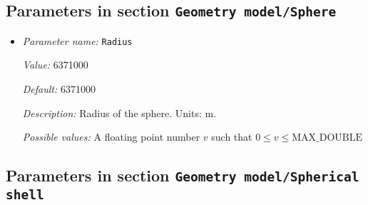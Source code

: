 \subsection{Parameters in section \tt Geometry model/Sphere}
\label{parameters:Geometry_20model/Sphere}

\begin{itemize}
\item {\it Parameter name:} {\tt Radius}
\label{parameters:Geometry model/Sphere/Radius}
\label{parameters:Geometry_20model/Sphere/Radius}


{\it Value:} 6371000


{\it Default:} 6371000


{\it Description:} Radius of the sphere. Units: m.


{\it Possible values:} A floating point number $v$ such that $0 \leq v \leq \text{MAX\_DOUBLE}$
\end{itemize}

\subsection{Parameters in section \tt Geometry model/Spherical shell}
\label{parameters:Geometry_20model/Spherical_20shell}

